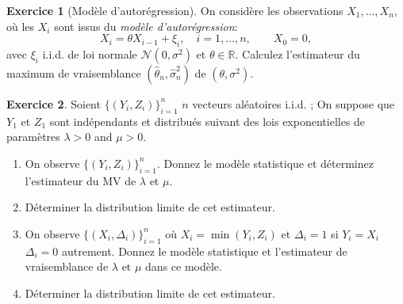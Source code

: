 \documentclass[a4paper,11pt,fleqn]{article}
\newcommand{\R}{\ensuremath{\mathbb{R}}}
\theoremstyle{definition}
\newtheorem{exercice}{Exercice}
\begin{document}
\begin{exercice}[Mod\`ele d'autor\'egression]

On consid\`ere les observations $X_1,\dots,X_n$, o\`u les $X_i$
sont issus du {\it mod\`ele d'autor\'egression}:
$$
X_i=\theta X_{i-1} + \xi_i, \quad i=1,\dots,n, \quad\quad X_0=0,
$$
avec $\xi_i$ i.i.d. de loi normale ${\mathcal N}(0,\sigma^2)$ et
$\theta\in \R$.
Calculez l'estimateur du maximum de vraisemblance  $(\hat \theta_n,\hat \sigma_{n}^2)$ de $(\theta,\sigma^2)$.



\end{exercice}

\begin{exercice}
Soient $\{(Y_i,Z_i)\}_{i=1}^n$ $n$ vecteurs aléatoires i.i.d. ; On suppose que $Y_1$ et $Z_1$ sont indépendants et distribués suivant des lois exponentielles de paramètres $\lambda > 0$ and $\mu > 0$.
\begin{enumerate}
\item On  observe $\{(Y_i,Z_i) \}_{i=1}^n$. Donnez le modèle statistique et déterminez l'estimateur du MV de $\lambda$ et $\mu$.
\item Déterminer la distribution limite de cet estimateur.
\item On observe $\{(X_i,\Delta_i)\}_{i=1}^n$ où $X_i= \min(Y_i,Z_i)$ et $\Delta_i= 1$ si $Y_i = X_i$ $\Delta_i=0$ autrement. Donnez le modèle statistique et l'estimateur de vraisemblance de $\lambda$ et $\mu$ dans ce modèle.
\item Déterminer la distribution limite de cet estimateur.
\end{enumerate}
\end{exercice}
\end{document}
